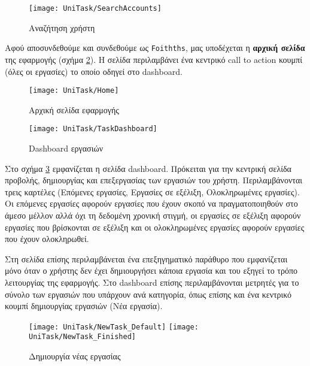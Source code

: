         \begin{figure}[h!] \noindent \centering
            \texttt{[image: UniTask/SearchAccounts]}
            \caption{\centering Αναζήτηση χρήστη}
            \label{fig:unitask_SearchAccounts}
        \end{figure}

        Αφού αποσυνδεθούμε και συνδεθούμε ως \texttt{Foithths}, μας υποδέχεται η \textbf{αρχική σελίδα} της εφαρμογής (σχήμα \ref{fig:unitask_Home}). Η σελίδα περιλαμβάνει ένα κεντρικό call to action κουμπί ({\Zona όλες οι εργασίες}) το οποίο οδηγεί στο {\Zona dashboard}.

        \begin{figure}[h!] \noindent \centering
            \texttt{[image: UniTask/Home]}
            \caption{\centering Αρχική σελίδα εφαρμογής}
            \label{fig:unitask_Home}
        \end{figure}

        \begin{figure}[h!] \noindent \centering
            \texttt{[image: UniTask/TaskDashboard]}
            \caption{\centering Dashboard εργασιών}
            \label{fig:unitask_TaskDashboard}
        \end{figure}

        Στο σχήμα \ref{fig:unitask_TaskDashboard} εμφανίζεται η σελίδα {\ZonaSB dashboard}. Πρόκειται για την κεντρική σελίδα προβολής, δημιουργίας και επεξεργασίας των εργασιών του χρήστη. Περιλαμβάνονται τρεις καρτέλες ({\Zona Επόμενες εργασίες}, {\Zona Εργασίες σε εξέλιξη}, {\Zona Ολοκληρωμένες εργασίες}). Οι επόμενες εργασίες αφορούν εργασίες που έχουν σκοπό να πραγματοποιηθούν στο άμεσο μέλλον αλλά όχι τη δεδομένη χρονική στιγμή, οι εργασίες σε εξέλιξη αφορούν εργασίες που βρίσκονται σε εξέλιξη και οι ολοκληρωμένες εργασίες αφορούν εργασίες που έχουν ολοκληρωθεί.

        Στη σελίδα επίσης περιλαμβάνεται ένα επεξηγηματικό παράθυρο που εμφανίζεται μόνο όταν ο χρήστης δεν έχει δημιουργήσει κάποια εργασία και του εξηγεί το τρόπο λειτουργίας της εφαρμογής. Στο {\Zona dashboard} επίσης περιλαμβάνονται μετρητές για το σύνολο των εργασιών που υπάρχουν ανά κατηγορία, όπως επίσης και ένα κεντρικό κουμπί δημιουργίας εργασιών ({\Zona Νέα εργασία}).

        \begin{figure}[h!] \noindent \centering
            \texttt{[image: UniTask/NewTask\_Default]}
            \texttt{[image: UniTask/NewTask\_Finished]}
            \caption{\centering Δημιουργία νέας εργασίας}
            \label{fig:unitask_NewTask}
        \end{figure}

